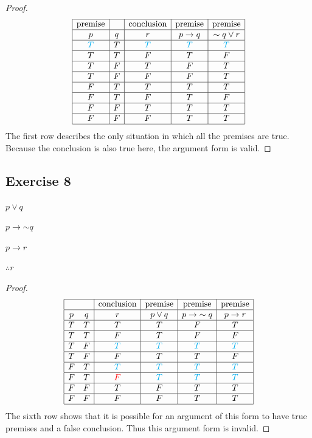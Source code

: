 \documentclass[14pt]{extarticle}
\begin{document}
\begin{proof}
$$
\begin{array}{|c|c|c|c|c|}
\hline
\text{premise} & & \text{conclusion} & \text{premise} & \text{premise} \\
\hline
p & q & r & p \to q & {\sim q} \vee r \\
\hline
\color{cyan} T & T & \color{cyan} T & \color{cyan} T & \color{cyan} T \\
\hline
T & T & F & T & F \\
\hline
T & F & T & F & T \\
\hline
T & F & F & F & T \\
\hline
F & T & T & T & T \\
\hline
F & T & F & T & F \\
\hline
F & F & T & T & T \\
\hline
F & F & F & T & T \\
\hline
\end{array}
$$
The first row describes the only situation in which all the premises are true. Because the conclusion is also true here, the argument form is valid.
\end{proof}

\subsection{Exercise 8}
$p \vee q$

$p \to {\sim q}$

$p \to r$

$\therefore r$

\begin{proof}
$$
\begin{array}{|cc|c|c|c|c|}
\hline
& & \text{conclusion} & \text{premise} & \text{premise} & \text{premise} \\
\hline
p & q & r & p \vee q & p \to {\sim q} & p \to r \\
\hline
T & T & T & T & F & T \\
\hline
T & T & F & T & F & F \\
\hline
T & F & \color{cyan} T & \color{cyan} T & \color{cyan} T & \color{cyan} T \\
\hline
T & F & F & T & T & F \\
\hline
F & T & \color{cyan} T & \color{cyan} T & \color{cyan} T & \color{cyan} T \\
\hline
F & T & \color{red} F & \color{cyan} T & \color{cyan} T & \color{cyan} T \\
\hline
F & F & T & F & T & T \\
\hline
F & F & F & F & T & T \\
\hline
\end{array}
$$
The sixth row shows that it is possible for an argument of this form to have true premises and a false conclusion. Thus this argument form is invalid.
\end{proof}
\end{document}
